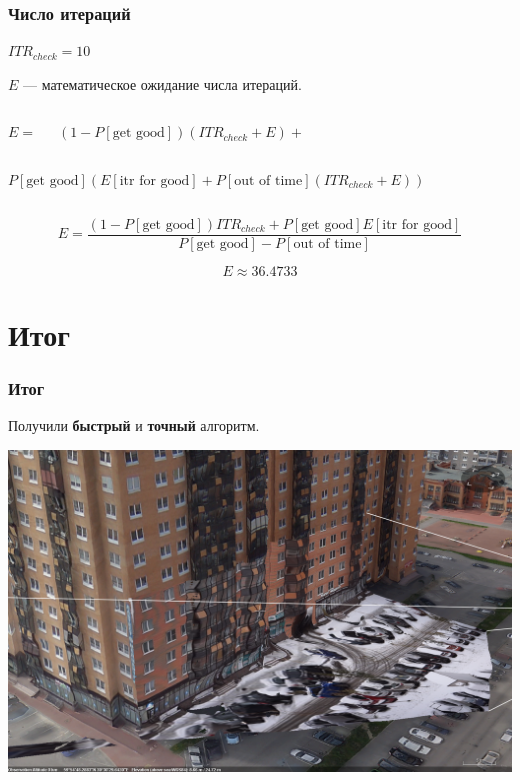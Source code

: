 \documentclass{beamer}
\begin{document}
\begin{frame}[fragile]
\begin{spacing}{1.5}
	\frametitle{Число итераций}
	
	$ITR_{check} = 10$
	
	$E$ --- математическое ожидание числа итераций.\\
	\begin{columns}[c]
		$E = $
		
		$(1-P[\text{get good}])(ITR_{check} + E) +$
	\end{columns}
	\begin{columns}[c]
		
		$P[\text{get good}](E[\text{itr for good}] + P[\text{out of time}](ITR_{check} + E))$
	\end{columns}
	
	$$E = \frac{(1-P[\text{get good}])ITR_{check} + P[\text{get good}]E[\text{itr for good}]}{P[\text{get good}] - P[\text{out of time}]}$$
	
	$$E \approx 36.4733$$
\end{spacing}
\end{frame}

\section{Итог}

\begin{frame}
\frametitle{Итог}
	\centerline{Получили \textbf{быстрый} и \textbf{точный} алгоритм.}
	
	\centerline{\includegraphics[scale=0.26]{sample.png}}
\end{frame}

\end{document}
